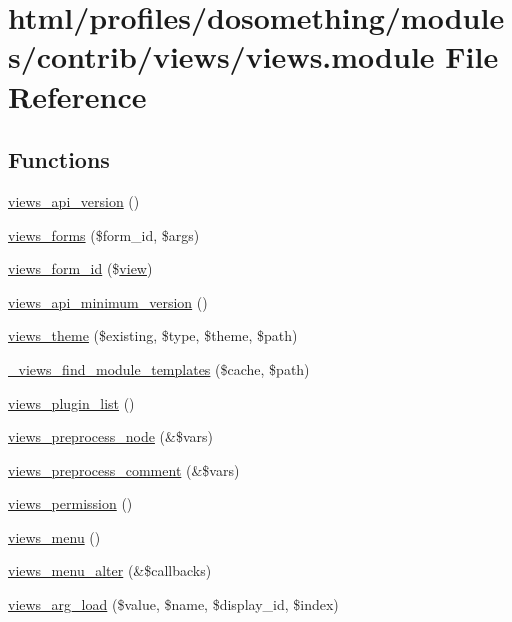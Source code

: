 \hypertarget{views_8module}{
\section{html/profiles/dosomething/modules/contrib/views/views.module File Reference}
\label{views_8module}
}
\subsection*{Functions}
\begin{DoxyCompactItemize}
\item 
\hyperlink{views_8module_a771e26f3407f1baf8ffbaa97e7b91579}{views\_\-api\_\-version} ()
\item 
\hyperlink{views_8module_afed058cc3f58a834a8c72c0a8129032b}{views\_\-forms} (\$form\_\-id, \$args)
\item 
\hyperlink{views_8module_abd283e66b3b172682b7a1fe2b59fbca9}{views\_\-form\_\-id} (\$\hyperlink{classview}{view})
\item 
\hyperlink{views_8module_a218d917d0079bfe634c320d51e0ab403}{views\_\-api\_\-minimum\_\-version} ()
\item 
\hyperlink{views_8module_aff7ae737313bb2250e6c27f9ca520627}{views\_\-theme} (\$existing, \$type, \$theme, \$path)
\item 
\hyperlink{views_8module_a80aabc6f7846ad34568192eec17b70d7}{\_\-views\_\-find\_\-module\_\-templates} (\$cache, \$path)
\item 
\hyperlink{views_8module_a29c38bcb5187337aaa3fa82750bb67b9}{views\_\-plugin\_\-list} ()
\item 
\hyperlink{views_8module_aa21197cc54893f9efe75b3200a86d1c2}{views\_\-preprocess\_\-node} (\&\$vars)
\item 
\hyperlink{views_8module_a79869d9e32f3a55cb67f8024a35ea2ac}{views\_\-preprocess\_\-comment} (\&\$vars)
\item 
\hyperlink{views_8module_a0d62d027dd49788bfa55b9011c0af70f}{views\_\-permission} ()
\item 
\hyperlink{views_8module_ab62ba1ad3afe80e5bf544339a6a690b6}{views\_\-menu} ()
\item 
\hyperlink{views_8module_a927f922bf3e583010e7deb46db1cbb4e}{views\_\-menu\_\-alter} (\&\$callbacks)
\item 
\hyperlink{views_8module_a606f90f31faa85d799a5ff1dc82cc8f1}{views\_\-arg\_\-load} (\$value, \$name, \$display\_\-id, \$index)

\end{DoxyCompactItemize}

